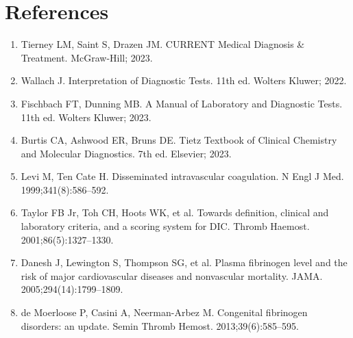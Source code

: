\section*{References}
\begin{enumerate}
  \item Tierney LM, Saint S, Drazen JM. CURRENT Medical Diagnosis \& Treatment. McGraw-Hill; 2023.
  \item Wallach J. Interpretation of Diagnostic Tests. 11th ed. Wolters Kluwer; 2022.
  \item Fischbach FT, Dunning MB. A Manual of Laboratory and Diagnostic Tests. 11th ed. Wolters Kluwer; 2023.
  \item Burtis CA, Ashwood ER, Bruns DE. Tietz Textbook of Clinical Chemistry and Molecular Diagnostics. 7th ed. Elsevier; 2023.
  \item Levi M, Ten Cate H. Disseminated intravascular coagulation. N Engl J Med. 1999;341(8):586--592.
  \item Taylor FB Jr, Toh CH, Hoots WK, et al. Towards definition, clinical and laboratory criteria, and a scoring system for DIC. Thromb Haemost. 2001;86(5):1327--1330.
  \item Danesh J, Lewington S, Thompson SG, et al. Plasma fibrinogen level and the risk of major cardiovascular diseases and nonvascular mortality. JAMA. 2005;294(14):1799--1809.
  \item de Moerloose P, Casini A, Neerman-Arbez M. Congenital fibrinogen disorders: an update. Semin Thromb Hemost. 2013;39(6):585--595.
\end{enumerate}

\clearpage
